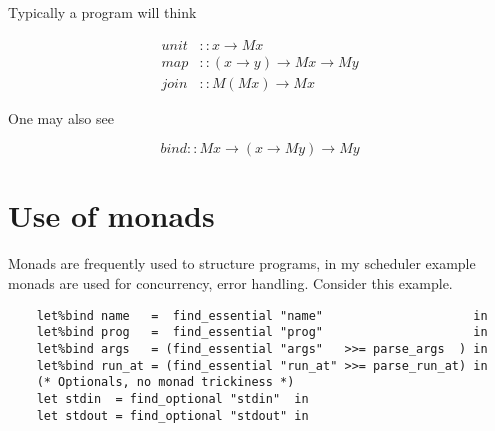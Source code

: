 \documentclass[a4paper,10pt]{article}
\begin{document}
Typically a program will think

\begin{equation}
  \begin{split}
    unit &:: x \rightarrow M x                                 \\
    map  &:: (x \rightarrow y) \rightarrow M x \rightarrow M y \\
    join &:: M (M x) \rightarrow M x
  \end{split}
\end{equation}

One may also see

\begin{equation}
  bind :: M x \rightarrow (x \rightarrow M y) \rightarrow M y
\end{equation}

\section{Use of monads}
Monads are frequently used to structure programs, in my scheduler example monads are
used for concurrency, error handling. Consider this example.

\begin{lstlisting}
    let%bind name   =  find_essential "name"                     in
    let%bind prog   =  find_essential "prog"                     in
    let%bind args   = (find_essential "args"   >>= parse_args  ) in
    let%bind run_at = (find_essential "run_at" >>= parse_run_at) in
    (* Optionals, no monad trickiness *)
    let stdin  = find_optional "stdin"  in
    let stdout = find_optional "stdout" in
\end{lstlisting}



\medskip



\end{document}
